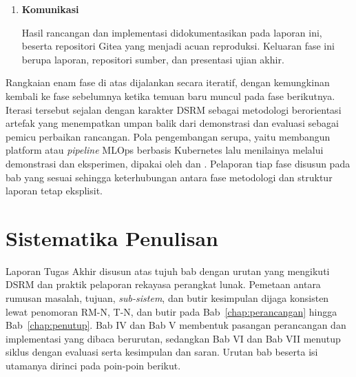 \begin{enumerate}
    Evaluasi dilaksanakan pada akhir siklus implementasi dengan tiga dimensi, yaitu fungsional, nonfungsional (latensi indikatif, skalabilitas struktural, ketersediaan, observabilitas, keamanan, biaya), serta tata kelola (\textit{lineage} tertelusur, kontrak data ditegakkan, kebijakan akses dapat diaudit). Angka kuantitatif evaluasi dilaporkan pada Bab~\ref{chap:evaluasi}.

    \vspace{0.5em}

    \item \textbf{Komunikasi}

    Hasil rancangan dan implementasi didokumentasikan pada laporan ini, beserta repositori Gitea yang menjadi acuan reproduksi. Keluaran fase ini berupa laporan, repositori sumber, dan presentasi ujian akhir.
\end{enumerate}

Rangkaian enam fase di atas dijalankan secara iteratif, dengan kemungkinan kembali ke fase sebelumnya ketika temuan baru muncul pada fase berikutnya. Iterasi tersebut sejalan dengan karakter DSRM sebagai metodologi berorientasi artefak yang menempatkan umpan balik dari demonstrasi dan evaluasi sebagai pemicu perbaikan rancangan. Pola pengembangan serupa, yaitu membangun platform atau \textit{pipeline} MLOps berbasis Kubernetes lalu menilainya melalui demonstrasi dan eksperimen, dipakai oleh \textcite{hsu2024endtoend} dan \textcite{rodrigues2025architecture}. Pelaporan tiap fase disusun pada bab yang sesuai sehingga keterhubungan antara fase metodologi dan struktur laporan tetap eksplisit.

\section{Sistematika Penulisan}
\label{sec:sistematika}

Laporan Tugas Akhir disusun atas tujuh bab dengan urutan yang mengikuti DSRM dan praktik pelaporan rekayasa perangkat lunak. Pemetaan antara rumusan masalah, tujuan, \textit{sub-sistem}, dan butir kesimpulan dijaga konsisten lewat penomoran RM-N, T-N, dan butir pada Bab~\ref{chap:perancangan} hingga Bab~\ref{chap:penutup}. Bab IV dan Bab V membentuk pasangan perancangan dan implementasi yang dibaca berurutan, sedangkan Bab VI dan Bab VII menutup siklus dengan evaluasi serta kesimpulan dan saran. Urutan bab beserta isi utamanya dirinci pada poin-poin berikut.

